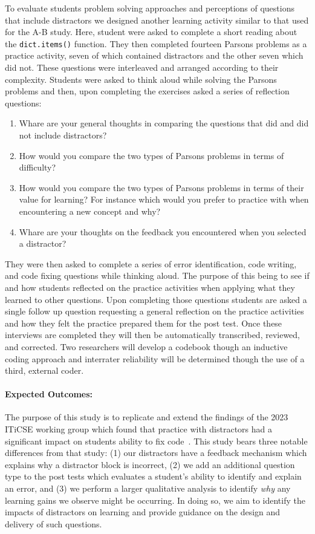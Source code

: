 \documentclass[authorversion,nonacm]{acmart}
\begin{document}
To evaluate students problem solving approaches and perceptions of questions 
that include distractors we designed another learning activity similar to that
used for the A-B study. Here, student were asked to complete a short reading about
the \texttt{dict.items()} function. They then completed fourteen Parsons problems 
as a practice activity, seven of which contained distractors and the other seven
which did not. These questions were interleaved and arranged according to their
complexity. Students were asked to think aloud while solving the Parsons
problems and then, upon completing the exercises asked a series of reflection questions:
\begin{enumerate}
  \item Whare are your general thoughts in comparing the questions that did and did not include distractors?
  \item How would you compare the two types of Parsons problems in terms of difficulty?
  \item How would you compare the two types of Parsons problems in terms of their value for learning? For instance which would you prefer to practice with when encountering a new concept and why?
  \item Whare are your thoughts on the feedback you encountered when you selected a distractor?
\end{enumerate}
They were then asked to complete a series of error identification, code
writing, and code fixing questions while thinking aloud. The purpose of this
being to see if and how students reflected on the practice activities when
applying what they learned to other questions. Upon completing those questions
students are asked a single follow up question requesting a general 
reflection on the practice activities and how they felt the practice prepared 
them for the post test.  Once these interviews are completed they will then be
automatically transcribed, reviewed, and corrected. Two researchers will
develop a codebook though an inductive coding approach and interrater
reliability will be determined though the use of a third, external coder.

\paragraph{Expected Outcomes:} The purpose of this study is to replicate and
extend the findings of the 2023 ITiCSE working group which found that practice
with distractors had a significant impact on students ability to fix
code~\cite{ericson2023multi}. This study bears three notable differences from
that study: (1) our distractors have a feedback mechanism which explains why a
distractor block is incorrect, (2) we add an additional question type to the
post tests which evaluates a student's ability to identify and explain an
error, and (3) we perform a larger qualitative analysis to identify
\textit{why} any learning gains we observe might be occurring. In doing so, we
aim to identify the impacts of distractors on learning and provide guidance on
the design and delivery of such questions.
\end{document}
